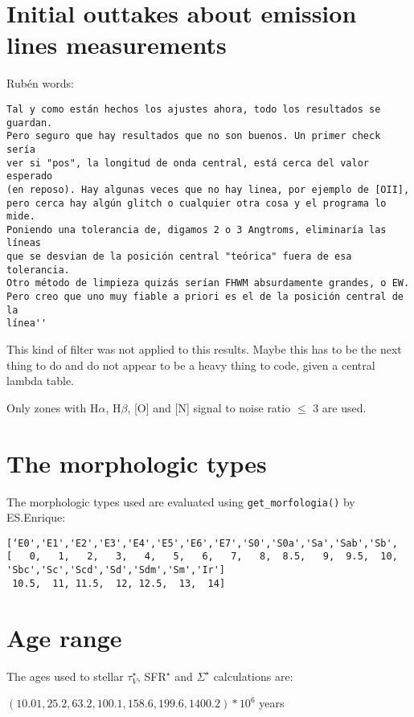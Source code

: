 \documentclass[a4paper,12pt]{article}
\begin{document}
\section{Initial outtakes about emission lines measurements}

Rub\'en words:

\begin{verbatim}
Tal y como están hechos los ajustes ahora, todo los resultados se guardan. 
Pero seguro que hay resultados que no son buenos. Un primer check sería 
ver si "pos", la longitud de onda central, está cerca del valor esperado 
(en reposo). Hay algunas veces que no hay linea, por ejemplo de [OII], 
pero cerca hay algún glitch o cualquier otra cosa y el programa lo mide. 
Poniendo una tolerancia de, digamos 2 o 3 Angtroms, eliminaría las líneas 
que se desvian de la posición central "teórica" fuera de esa tolerancia. 
Otro método de limpieza quizás serían FHWM absurdamente grandes, o EW. 
Pero creo que uno muy fiable a priori es el de la posición central de la 
línea''
\end{verbatim}

This kind of filter was not applied to this results. Maybe this has to be the next thing to do and do not appear to be a heavy thing to code, given a central lambda table. 

Only zones with H$\alpha$, H$\beta$, [O] and [N] signal to noise ratio $\leq$ 3 are used.

\section{The morphologic types}
The morphologic types used are evaluated using \texttt{get\_morfologia()} by ES.Enrique:

\begin{verbatim}
[‘E0','E1','E2','E3','E4','E5','E6','E7','S0','S0a','Sa','Sab','Sb',
[   0,   1,   2,   3,   4,   5,   6,   7,   8,  8.5,   9,  9.5,  10,  
'Sbc','Sc','Scd','Sd','Sdm','Sm','Ir']
 10.5,  11, 11.5,  12, 12.5,  13,  14]
\end{verbatim}

\section{Age range}
The ages used to stellar $\tau_V^{\star}$, SFR${}^\star$ and $\Sigma^\star$ calculations are: \

$\left( 10.01 , 25.2 , 63.2, 100.1 , 158.6 , 199.6 , 1400.2 \right) * 10^6$ years
\end{document}
